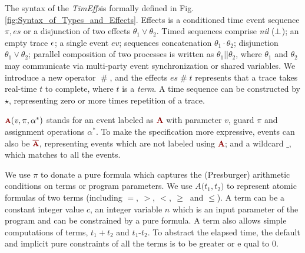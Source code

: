 \documentclass[acmsmall,10pt,review]{acmart}
\newcommand{\es}{\theta}
\newcommand{\timedEffects}{\emph{TimEffs}}
\newcommand{\anyevent}[1]{{\textcolor{darkred}
{{\textbf{\footnotesize #1}}}}}
\newcommand{\anynotevent}[1]{{\textcolor{darkred}
{{\textbf{\footnotesize $\overline{\text{#1}}$}}}}}
\newcommand{\code}[1]{{\tt{\ensuremath{\m{#1}}}}}
\newcommand{\empt}{\textcolor{black}{\ensuremath{\epsilon}}}
\newcommand{\bott}{\textcolor{black}{\ensuremath{\bot}}}
\newcommand{\m}{\mathit}
\newcommand{\mysharp}{{\mathrel{\texttt{\#}}}}
\newcommand\figref[1]{Fig. \textcolor{black}{\ref{#1}}.}
\begin{document}
{The  syntax of the \timedEffects is formally defined in 
\figref{fig:Syntax_of_Types_and_Effects} Effects is 
 a conditioned time  event sequence \code{{\pi},  es} or a disjunction of two effects $\es_1 \vee \es_2$.
Timed sequences comprise \textit{nil} ($\bott$);
 an empty trace $\empt$;
a single event \code{ev};
 sequences concatenation \code{\es_1\cdot \es_2};
disjunction  \code{\es_1\vee \es_2};
parallel composition of two processes is written as \code{\es_1 || \es_2}, where \code{\es_1} and \code{\es_2} 
may communicate via multi-party event synchronization or shared variables. 
We introduce a new operator \code{\mysharp }, and the effects \code{es \mysharp  t } represents that a trace takes real-time \code{t} to complete, where \code{t} is a \emph{term}. 
A time sequence can be constructed by \code{\star}, representing zero or more times repetition of a trace.

\code{\anyevent{A}(v, \pi, \alpha^*)} stands for an event labeled 
as \anyevent{A} with parameter \code{v}, guard \code{\pi} and assignment operations \code{\alpha^*}. 
To make the specification more expressive, events can also be 
\code{\anynotevent{A}}, representing  events which are not 
labeled using \anyevent{A}; and a wildcard \code{\_}, which matches to all the events.



We use \code{{\pi}} to donate a pure formula which captures the (Presburger) arithmetic conditions on terms or program parameters. 
We use \code{{A(}{t_1, t_2}{)}} to represent atomic formulas of two terms (including $  {=},
   \ {>},
   \ {<},
   \ {\geq}\ $ and $ {\leq} $).
A term can be a constant integer value \code{c}, an integer variable \code{n} which is an input parameter of the program and can be constrained by a pure formula. 
A term also allows simple computations of terms, \code{t_1{+}t_2} and \code{t_1\text{-}t_2}. To abstract the elapsed time, the default and implicit pure constraints of all the terms is to be greater or e
qual to  0. 


}
\end{document}
